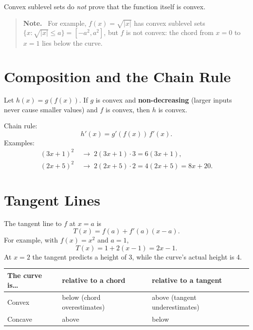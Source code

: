 \documentclass[11pt]{article}
\newenvironment{aside}{\begin{quote}\small\color{black!65}\textbf{Note.}\ }{\end{quote}}
\begin{document}
Convex sublevel sets do \emph{not} prove that the function itself is convex.

\begin{aside}
For example, $f(x) = \sqrt{|x|}$ has convex sublevel sets
$\{x : \sqrt{|x|} \le a\} = [-a^2, a^2]$, but $f$ is not convex: the chord from
$x = 0$ to $x = 1$ lies below the curve.
\end{aside}

\section{Composition and the Chain Rule}

Let $h(x) = g(f(x))$. If $g$ is convex and \textbf{non-decreasing} (larger inputs
never cause smaller values) and $f$ is convex, then $h$ is convex.

Chain rule:
\[
    h'(x) = g'(f(x))\, f'(x).
\]
Examples:
\begin{align*}
    (3x+1)^2 &\;\to\; 2(3x+1) \cdot 3 = 6(3x+1), \\
    (2x+5)^2 &\;\to\; 2(2x+5) \cdot 2 = 4(2x+5) = 8x + 20.
\end{align*}

\section{Tangent Lines}

The tangent line to $f$ at $x = a$ is
\[
    T(x) = f(a) + f'(a)(x - a).
\]
For example, with $f(x) = x^2$ and $a = 1$,
\[
    T(x) = 1 + 2(x - 1) = 2x - 1.
\]
At $x = 2$ the tangent predicts a height of 3, while the curve's actual height is 4.

\begin{center}
\begin{tabular}{lll}
    \toprule
    The curve is\ldots & relative to a chord & relative to a tangent \\
    \midrule
    Convex  & below (chord overestimates) & above (tangent underestimates) \\
    Concave & above & below \\
    \bottomrule
\end{tabular}
\end{center}
\end{document}
